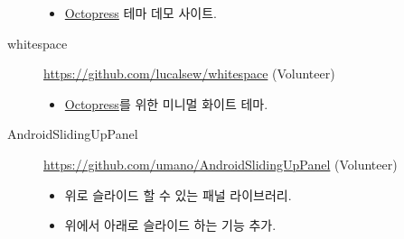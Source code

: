 \documentclass[a4paper,10pt]{article}
\begin{document}
\begin{description}
    \begin{itemize}
      \item \href{http://octopress.org}{Octopress} 테마 데모 사이트.
    \end{itemize}
  \item[whitespace] \url{https://github.com/lucalsew/whitespace} (Volunteer)
    \begin{itemize}
      \item \href{http://octopress.org}{Octopress}를 위한 미니멀 화이트 테마.
    \end{itemize}
  \item[AndroidSlidingUpPanel] \url{https://github.com/umano/AndroidSlidingUpPanel} (Volunteer)
    \begin{itemize}
      \item 위로 슬라이드 할 수 있는 패널 라이브러리.
      \item 위에서 아래로 슬라이드 하는 기능 추가.
    \end{itemize}
\end{description}


\end{document}
